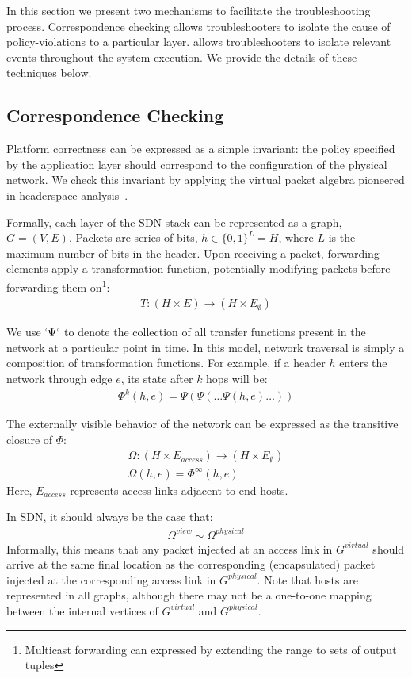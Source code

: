 In this section we present two mechanisms to facilitate the troubleshooting
process. Correspondence checking allows troubleshooters to isolate
the cause of policy-violations to a particular layer. \Simulator{}
allows troubleshooters to isolate relevant events throughout the system
execution. We provide the details of these techniques below. 

\subsection{Correspondence Checking}

Platform correctness can be expressed as a simple invariant:
the policy specified by the application layer should correspond to the
configuration of the
physical network. We check this invariant by applying the virtual packet
algebra pioneered in headerspace analysis~\cite{hsa}. 

Formally, each layer of the SDN stack can be represented as a graph,
$G = (V, E)$. Packets are series of bits, $h \in \{0,1\}^L = H$,
where $L$ is the maximum number of bits in the header. Upon receiving a packet,
forwarding elements apply a transformation function, potentially modifying
packets before forwarding them on\footnote{Multicast forwarding can expressed
by extending the range to sets of output tuples}:
\begin{align*}
T: (H \times E) \rightarrow (H \times E_{\emptyset})
\end{align*}

We use $`\Psi`$ to denote the collection of all transfer functions present in
the network at a particular point in time. In this model, network traversal is simply a composition of transformation
functions. For example, if a header $h$ enters the network through edge
$e$, its state after $k$ hops will be:
\begin{align*}
\Phi^k(h,e) = \Psi(\Psi(\dots \Psi(h,e)\dots))
\end{align*}

The externally visible behavior of the network can be expressed as the
transitive closure of $\Phi$:
\begin{align*}
\Omega: (H \times E_{access}) \rightarrow (H \times E_{\emptyset}) \\
\Omega(h,e) = \Phi^{\infty}(h,e)
\end{align*}
Here, $E_{access}$ represents access links adjacent to end-hosts.

In SDN, it should always be the case that:
\begin{align*}
\Omega^{view} \sim \Omega^{physical}
\end{align*}
Informally, this means that any packet injected at an access link in $G^{virtual}$ should arrive at
the same final location as the corresponding (encapsulated) packet injected at the
corresponding access link in $G^{physical}$. Note that hosts are represented
in all graphs, although there may not be a one-to-one mapping between the
internal vertices of $G^{virtual}$ and $G^{physical}$.

